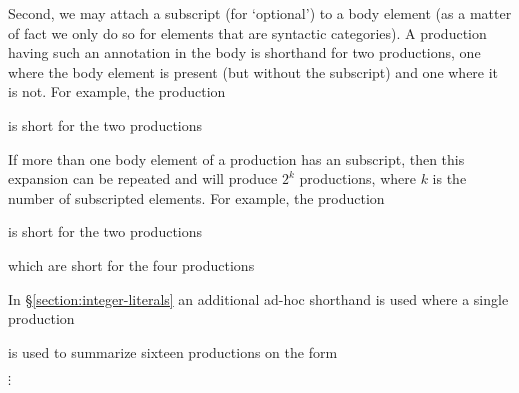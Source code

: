Second, we may attach a subscript  (for `optional')
to a body element (as a matter of fact
we only do so for elements that are syntactic categories).  A production having
such an annotation in the body is shorthand for two productions, one where the body
element is present (but without the subscript) and one where it is not.
For example, the production
\begin{rules}
       {  }
\end{rules}
is short for the two productions
\begin{rules}
       {  }

       { }
\end{rules}
If more than one body element of a production has an 
subscript, then this expansion can be repeated and will produce $2^k$ productions,
where $k$ is the number of subscripted elements.
For example, the production
\begin{rules}
       {  }
\end{rules}
is short for the two productions
\begin{rules}
       {  }
       { }
\end{rules}
which are short for the four productions
\begin{rules}
       {  }

       { }

       { }

       {}
\end{rules}
In \S\ref{section:integer-literals} an additional ad-hoc shorthand is used
where a single production
\begin{rules}
       {}
\end{rules}
is used to summarize sixteen productions on the form
\begin{rules}
       { \OR
        }
\vdotsrule
{}
       { \OR
         \OR
        $\vdots$ \OR
         \OR
         \OR
         \OR
        }
\end{rules}

